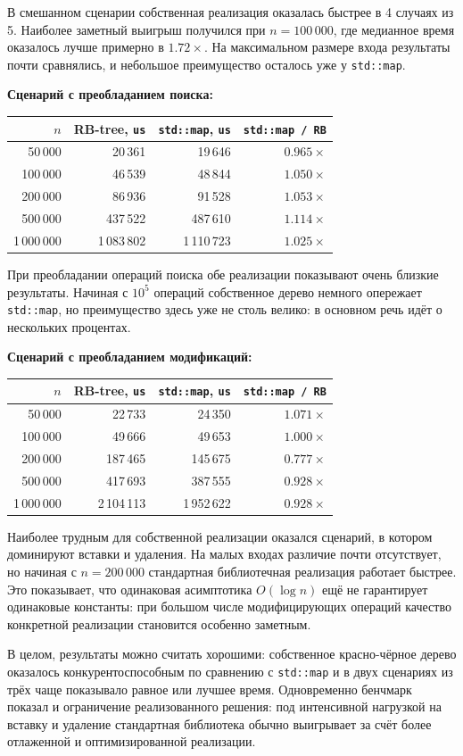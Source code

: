 В смешанном сценарии собственная реализация оказалась быстрее в 4 случаях из 5. Наиболее заметный выигрыш получился при $n = 100\,000$, где медианное время оказалось лучше примерно в $1.72\times$. На максимальном размере входа результаты почти сравнялись, и небольшое преимущество осталось уже у \texttt{std::map}.

\textbf{Сценарий с преобладанием поиска:}
\begin{longtable}{|r|r|r|r|}
\hline
\rowcolor{lightgray}
$n$ & RB-tree, \texttt{us} & \texttt{std::map}, \texttt{us} & \texttt{std::map / RB} \\
\hline
50\,000 & 20\,361 & 19\,646 & $0.965\times$ \\
\hline
100\,000 & 46\,539 & 48\,844 & $1.050\times$ \\
\hline
200\,000 & 86\,936 & 91\,528 & $1.053\times$ \\
\hline
500\,000 & 437\,522 & 487\,610 & $1.114\times$ \\
\hline
1\,000\,000 & 1\,083\,802 & 1\,110\,723 & $1.025\times$ \\
\hline
\end{longtable}

При преобладании операций поиска обе реализации показывают очень близкие результаты. Начиная с $10^5$ операций собственное дерево немного опережает \texttt{std::map}, но преимущество здесь уже не столь велико: в основном речь идёт о нескольких процентах.

\textbf{Сценарий с преобладанием модификаций:}
\begin{longtable}{|r|r|r|r|}
\hline
\rowcolor{lightgray}
$n$ & RB-tree, \texttt{us} & \texttt{std::map}, \texttt{us} & \texttt{std::map / RB} \\
\hline
50\,000 & 22\,733 & 24\,350 & $1.071\times$ \\
\hline
100\,000 & 49\,666 & 49\,653 & $1.000\times$ \\
\hline
200\,000 & 187\,465 & 145\,675 & $0.777\times$ \\
\hline
500\,000 & 417\,693 & 387\,555 & $0.928\times$ \\
\hline
1\,000\,000 & 2\,104\,113 & 1\,952\,622 & $0.928\times$ \\
\hline
\end{longtable}

Наиболее трудным для собственной реализации оказался сценарий, в котором доминируют вставки и удаления. На малых входах различие почти отсутствует, но начиная с $n = 200\,000$ стандартная библиотечная реализация работает быстрее. Это показывает, что одинаковая асимптотика $O(\log n)$ ещё не гарантирует одинаковые константы: при большом числе модифицирующих операций качество конкретной реализации становится особенно заметным.

В целом, результаты можно считать хорошими: собственное красно-чёрное дерево оказалось конкурентоспособным по сравнению с \texttt{std::map} и в двух сценариях из трёх чаще показывало равное или лучшее время. Одновременно бенчмарк показал и ограничение реализованного решения: под интенсивной нагрузкой на вставку и удаление стандартная библиотека обычно выигрывает за счёт более отлаженной и оптимизированной реализации.
\pagebreak
